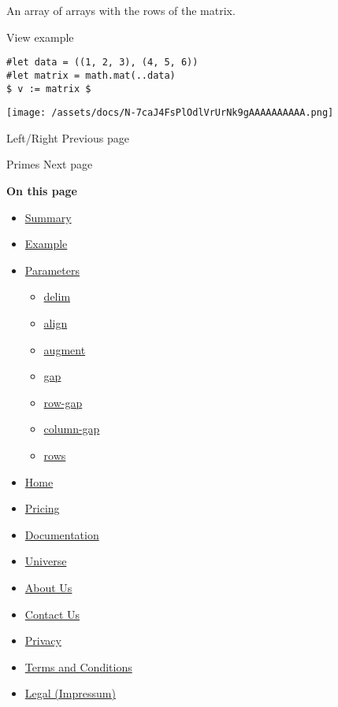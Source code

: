 An array of arrays with the rows of the matrix.


View example

\begin{verbatim}
#let data = ((1, 2, 3), (4, 5, 6))
#let matrix = math.mat(..data)
$ v := matrix $
\end{verbatim}

\texttt{[image: /assets/docs/N-7caJ4FsPlOdlVrUrNk9gAAAAAAAAAA.png]}

\href{/docs/reference/math/lr/}{\pandocbounded{}}

{ Left/Right } { Previous page }

\href{/docs/reference/math/primes/}{\pandocbounded{}}

{ Primes } { Next page }

\textbf{On this page}

\begin{itemize}
\tightlist
\item
  \hyperref[summary]{Summary}
\item
  \hyperref[example]{Example}
\item
  \hyperref[parameters]{Parameters}

  \begin{itemize}
  \tightlist
  \item
    \hyperref[parameters-delim]{delim}
  \item
    \hyperref[parameters-align]{align}
  \item
    \hyperref[parameters-augment]{augment}
  \item
    \hyperref[parameters-gap]{gap}
  \item
    \hyperref[parameters-row-gap]{row-gap}
  \item
    \hyperref[parameters-column-gap]{column-gap}
  \item
    \hyperref[parameters-rows]{rows}
  \end{itemize}
\end{itemize}

\begin{itemize}
\tightlist
\item
  \href{/}{Home}
\item
  \href{/pricing/}{Pricing}
\item
  \href{/docs/}{Documentation}
\item
  \href{/universe/}{Universe}
\item
  \href{/about/}{About Us}
\item
  \href{/contact/}{Contact Us}
\item
  \href{/privacy/}{Privacy}
\item
  \href{https://typst.app/terms}{Terms and Conditions}
\item
  \href{/legal/}{Legal (Impressum)}
\end{itemize}

